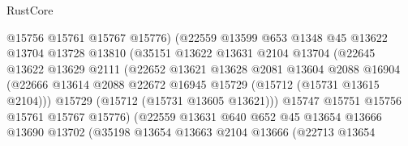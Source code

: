 \begin{lexlean}{RustCore}
\begin{coremodule}
                                @15756
                                @15761
                                @15767
                                @15776)
                              (@22559
                                @13599
                                @653
                                @1348
                                @45
                                @13622
                                @13704
                                @13728
                                @13810
                                (@35151
                                  @13622
                                  @13631
                                  @2104
                                  @13704
                                  (@22645
                                    @13622
                                    @13629
                                    @2111
                                    (@22652
                                      @13621
                                      @13628
                                      @2081
                                      @13604
                                      @2088
                                      @16904
                                      (@22666
                                        @13614
                                        @2088
                                        @22672
                                        @16945
                                        @15729
                                        (@15712 (@15731 @13615 @2104)))
                                      @15729
                                      (@15712 (@15731 @13605 @13621)))
                                    @15747
                                    @15751
                                    @15756
                                    @15761
                                    @15767
                                    @15776)
                                  (@22559
                                    @13631
                                    @640
                                    @652
                                    @45
                                    @13654
                                    @13666
                                    @13690
                                    @13702
                                    (@35198
                                      @13654
                                      @13663
                                      @2104
                                      @13666
                                      (@22713
                                        @13654

\end{coremodule}
\end{lexlean}
